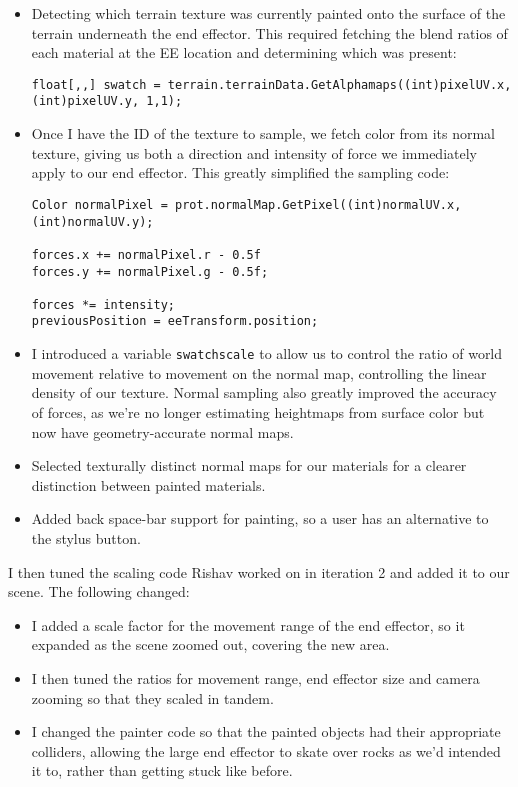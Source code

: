 \begin{itemize}
    \item Detecting which terrain texture was currently painted onto the surface of the terrain underneath the end effector. This required fetching the blend ratios of each material at the EE location and determining which was present:

          \begin{verbatim}
float[,,] swatch = terrain.terrainData.GetAlphamaps((int)pixelUV.x, (int)pixelUV.y, 1,1);
\end{verbatim}

    \item Once I have the ID of the texture to sample, we fetch color from its normal texture, giving us both a direction and intensity of force we immediately apply to our end effector. This greatly simplified the sampling code:

          \begin{verbatim}
Color normalPixel = prot.normalMap.GetPixel((int)normalUV.x, (int)normalUV.y);

forces.x += normalPixel.r - 0.5f
forces.y += normalPixel.g - 0.5f;

forces *= intensity;
previousPosition = eeTransform.position;
\end{verbatim}

    \item  I introduced a variable \texttt{swatchscale} to allow us to control the ratio of world movement relative to movement on the normal map, controlling the linear density of our texture. Normal sampling also greatly improved the accuracy of forces, as we’re no longer estimating heightmaps from surface color but now have geometry-accurate normal maps.
    \item  Selected texturally distinct normal maps for our materials for a clearer distinction between painted materials.
    \item  Added back space-bar support for painting, so a user has an alternative to the stylus button.
\end{itemize}

I then tuned the scaling code Rishav worked on in iteration 2 and added it to our scene. The following changed:

\begin{itemize}
    \item I added a scale factor for the movement range of the end effector, so it expanded as the scene zoomed out, covering the new area.
    \item I then tuned the ratios for movement range, end effector size and camera zooming so that they scaled in tandem.
    \item I changed the painter code so that the painted objects had their appropriate colliders, allowing the large end effector to skate over rocks as we’d intended it to, rather than getting stuck like before.
\end{itemize}


